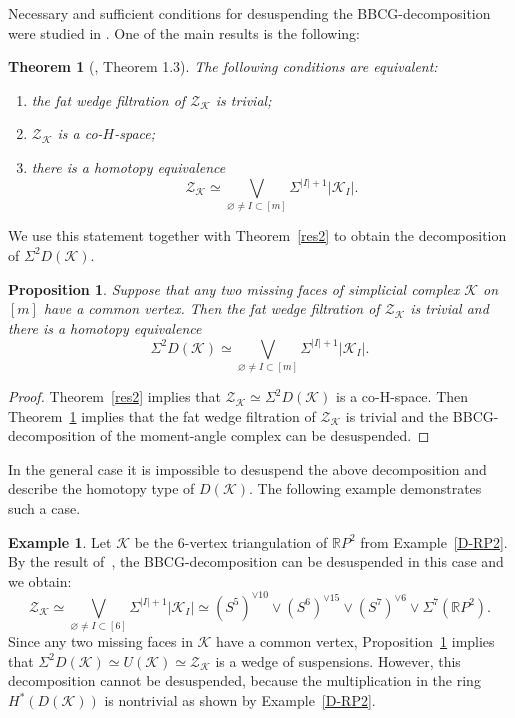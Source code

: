 \documentclass[a4paper,12pt]{amsart}
\newcommand{\K}{\mathcal K}
\newcommand{\RR}{\mathbb R}
\newcommand{\Z}{\mathcal Z}
\newtheorem{theorem}[formula]{Theorem}
\newtheorem{proposition}[formula]{Proposition}
\theoremstyle{definition}
\newtheorem{example}[formula]{Example}
\theoremstyle{remark}
\numberwithin{equation}{section}
\begin{document}
Necessary and sufficient conditions for desuspending the BBCG-decomposition were studied in \cite{IK}. One of the main results is the following:
\begin{theorem}[\cite{IK}, Theorem 1.3]\label{Kis}
	The following conditions are equivalent:
	\begin{enumerate}
		\item the fat wedge filtration of $\Z_\K$ is trivial;
		\item $\Z_\K$ is a co-$H$-space;
		\item there is a homotopy equivalence
			$$\Z_\K \simeq \bigvee_{\varnothing \neq I \subset [m]} \Sigma^{|I| + 1}|\K_I|.$$
	\end{enumerate}
\end{theorem}
We use this statement together with Theorem~\ref{res2} to obtain the decomposition of $\Sigma^2 D(\K)$.
\begin{proposition}\label{bbcg-dk}
	Suppose that any two missing faces of simplicial complex $\K$ on $[m]$ have a common vertex. Then the fat wedge filtration
	of $\Z_\K$ is trivial and there is a homotopy equivalence
	$$\Sigma^2 D(\K) \simeq \bigvee_{\varnothing \neq I \subset [m]} \Sigma^{|I| + 1} |\K_I|.$$
\end{proposition}
\begin{proof}
	Theorem~\ref{res2} implies that $\Z_\K \simeq \Sigma^2D(\K)$ is a co-H-space. Then Theorem~\ref{Kis} implies that the fat wedge filtration of $\Z_\K$ is trivial
	and the BBCG-decomposition of the moment-angle complex can be desuspended.
\end{proof}
In the general case it is impossible to desuspend the above decomposition and describe the homotopy type of $D(\K)$. The following example demonstrates such a case.
\begin{example}
Let $\K$ be the $6$-vertex triangulation of $\RR P^2$ from Example~\ref{D-RP2}. By the result of~\cite{GPTW}, the BBCG-decomposition
	can be desuspended in this case and we obtain:
	$$\Z_\K \simeq \bigvee_{\varnothing \neq I \subset [6]} \Sigma^{|I| + 1}|\K_I| 
	\simeq (S^5)^{\vee 10} \vee (S^6)^{\vee 15} \vee (S^7)^{\vee 6} \vee \Sigma^7(\RR P^2).$$
Since any two missing faces in $\K$ have a common vertex, Proposition~\ref{bbcg-dk} implies that $\Sigma^2 D(\K)\simeq U(\K)\simeq\Z_\K$ is a wedge of suspensions. However, this decomposition cannot be desuspended, because the multiplication in the ring $H^*(D(\K))$ is nontrivial as shown by Example~\ref{D-RP2}.
\end{example}
\end{document}
